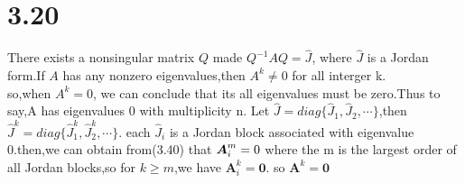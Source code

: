 \documentclass{article}
\begin{document}
\section*{3.20}
There exists a nonsingular matrix $Q$ made $Q^{-1}AQ=\hat{J}$,
where $\hat{J}$ is a Jordan form.If $A$ has any nonzero eigenvalues,then $A^k \neq 0$ for all interger k.\\
so,when $A^{k}=0$, we can conclude that its all eigenvalues must be zero.Thus to say,A has eigenvalues 0 with multiplicity n.
Let $\hat{J}=diag\{\hat{J}_1,\hat{J}_2,\cdots\}$,then $\hat{J}^{k}=diag\{\hat{J}^k_1,\hat{J}^k_2,\cdots\}.$
each $\hat{J}_i$ is a Jordan block associated with eigenvalue 0.then,we can obtain from(3.40) that $\boldsymbol{A}_i^m=\boldmath{0}$
where the m is the largest order of all Jordan blocks,so for $k \geq m$,we have $\boldsymbol{A}_i^k=\boldsymbol{0}$.
so $\boldsymbol{A}^k=\boldsymbol{0}$
\end{document}
